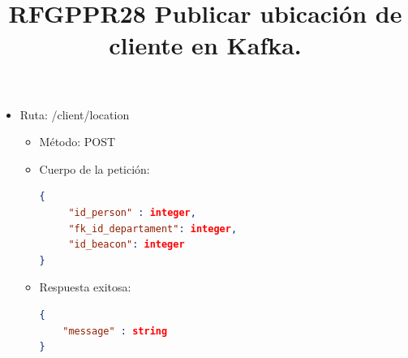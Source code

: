 \title{\textbf{RFGPPR28 Publicar ubicación de cliente en Kafka.}}
\begin{itemize}
\item Ruta: /client/location
\begin{itemize}
\item Método: POST
\item Cuerpo de la petición: 
\begin{lstlisting}[language=json,firstnumber=1]
{
	 "id_person" : integer, 
	 "fk_id_departament": integer, 
	 "id_beacon": integer
}
\end{lstlisting}
\item Respuesta exitosa: 
\begin{lstlisting}[language=json,firstnumber=1]
{
	"message" : string 
}
\end{lstlisting}
\end{itemize}
\end{itemize}

